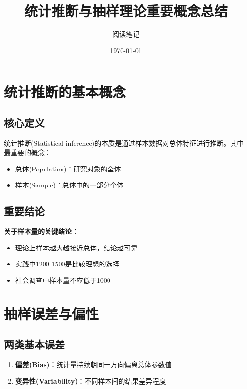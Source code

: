 \documentclass{article}
\begin{document}
\begin{CJK}{UTF8}{gbsn}

\title{统计推断与抽样理论重要概念总结}
\author{阅读笔记}
\date{\today}

\maketitle

\section{统计推断的基本概念}

\subsection{核心定义}
统计推断(Statistical inference)的本质是通过样本数据对总体特征进行推断。其中最重要的概念：
\begin{itemize}
    \item 总体(Population)：研究对象的全体
    \item 样本(Sample)：总体中的一部分个体
\end{itemize}

\subsection{重要结论}

\textbf{关于样本量的关键结论：}
\begin{itemize}
    \item 理论上样本越大越接近总体，结论越可靠
    \item 实践中1200-1500是比较理想的选择
    \item 社会调查中样本量不应低于1000
\end{itemize}

\section{抽样误差与偏性}

\subsection{两类基本误差}
\begin{enumerate}
    \item \textbf{偏差(Bias)}：统计量持续朝同一方向偏离总体参数值
    \item \textbf{变异性(Variability)}：不同样本间的结果差异程度
\end{enumerate}


\end{CJK}
\end{document}

